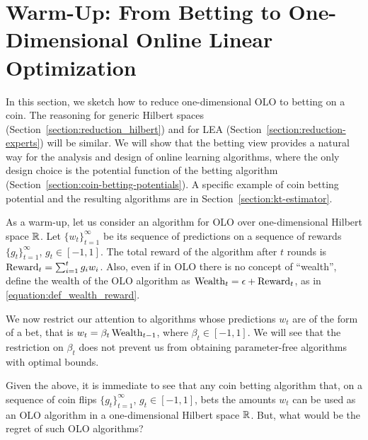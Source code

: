 \section{Warm-Up: From Betting to One-Dimensional Online Linear Optimization}
\label{section:one-dimensional-hilbert-space-olo}

In this section, we sketch how to reduce one-dimensional OLO to betting on a
coin. The reasoning for generic Hilbert spaces
(Section~\ref{section:reduction_hilbert}) and for LEA
(Section~\ref{section:reduction-experts}) will be similar. We will show that the
betting view provides a natural way for the analysis and design of online
learning algorithms, where the only design choice is the potential function of
the betting algorithm (Section~\ref{section:coin-betting-potentials}). A
specific example of coin betting potential and the resulting algorithms are in
Section~\ref{section:kt-estimator}.

As a warm-up, let us consider an algorithm for OLO over one-dimensional Hilbert
space $\mathbb{R}$.  Let $\{w_t\}_{t=1}^\infty$ be its sequence of predictions on a
sequence of rewards $\{g_t\}_{t=1}^\infty$, $g_t \in [-1,1]$. The total reward
of the algorithm after $t$ rounds is $\operatorname{Reward}_t = \sum_{i=1}^t g_i w_i$. Also,
even if in OLO there is no concept of ``wealth'', define the wealth of the OLO
algorithm as $\operatorname{Wealth}_t = \epsilon + \operatorname{Reward}_t$, as in
\eqref{equation:def_wealth_reward}.

We now restrict our attention to algorithms whose predictions $w_t$ are of the
form of a bet, that is $w_t = \beta_t \operatorname{Wealth}_{t-1}$, where $\beta_t \in
[-1,1]$.  We will see that the restriction on $\beta_t$ does not prevent us
from obtaining parameter-free algorithms with optimal bounds.

Given the above, it is immediate to see that any coin betting algorithm that,
on a sequence of coin flips $\{g_t\}_{t=1}^\infty$, $g_t \in [-1,1]$, bets the
amounts $w_t$ can be used as an OLO algorithm in a one-dimensional Hilbert
space $\mathbb{R}$. But, what would be the regret of such OLO algorithms?

